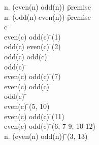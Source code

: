 \documentclass{article}
\begin{document}
\begin{proofbox}
\: \forall n. (\lnot even(n) \rightarrow odd(n)) \= \hbox{premise} \\
\: \forall n. (\lnot odd(n) \rightarrow even(n)) \= \hbox{premise} \\
\open
\: c \= \forallintroconst \\
\: \lnot even(c) \rightarrow odd(c) \= \forallelim(1) \\
\: \lnot odd(c) \rightarrow even(c) \= \forallelim(2) \\
\: odd(c) \lor \lnot odd(c) \= \lem \\
\openAlt
\: odd(c) \= \asm \\
\: even(c) \lor odd(c) \= \orintro(7) \\
\: even(c) \lor odd(c) \=  \\
\splitAlt
\: \lnot odd(c) \= \asm \\
\: even(c) \= \implieselim(5, 10) \\
\: even(c) \lor odd(c) \= \orintro(11) \\
\closeAlt
\: even(c) \lor odd(c) \= \orelim(6, 7-9, 10-12) \\
\close
\: \forall n. (even(n) \lor odd(n)) \= \forallintro(3, 13) \\
\end{proofbox}
\end{document}
